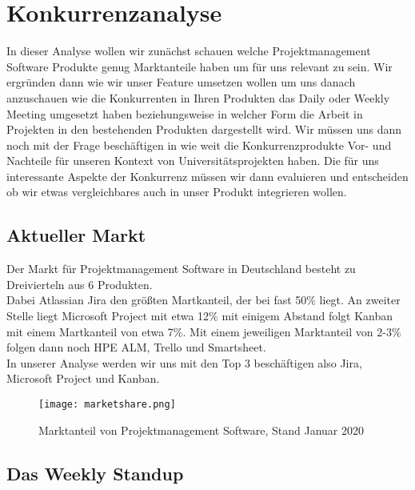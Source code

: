 \chapter{Konkurrenzanalyse}

In dieser Analyse wollen wir zunächst schauen welche Projektmanagement Software Produkte genug Marktanteile haben um für uns relevant zu sein. Wir ergründen dann wie wir unser Feature umsetzen wollen um uns danach anzuschauen wie die Konkurrenten in Ihren Produkten das Daily oder Weekly Meeting umgesetzt haben beziehungsweise in welcher Form die Arbeit in Projekten in den bestehenden Produkten dargestellt wird. Wir müssen uns dann noch mit der Frage beschäftigen in wie weit die Konkurrenzprodukte Vor- und Nachteile für unseren Kontext von Universitätsprojekten haben. Die für uns interessante Aspekte der Konkurrenz müssen wir dann evaluieren und entscheiden ob wir etwas vergleichbares auch in unser Produkt integrieren wollen.

\section{Aktueller Markt}

Der Markt für Projektmanagement Software in Deutschland besteht zu Dreivierteln aus 6 Produkten. \\
Dabei Atlassian Jira den größten Martkanteil, der bei fast 50\% liegt. An zweiter Stelle liegt Microsoft Project mit etwa 12\% mit einigem Abstand folgt Kanban mit einem Martkanteil von etwa 7\%. Mit einem jeweiligen Marktanteil von 2-3\% folgen dann noch HPE ALM, Trello und Smartsheet. \\
In unserer Analyse werden wir uns mit den Top 3 beschäftigen also Jira, Microsoft Project und Kanban. 

\begin{figure}[H]
	\centering
	\texttt{[image: marketshare.png]}
    \caption{Marktanteil von Projektmanagement Software, Stand Januar 2020\cite{statista2020}}
	\label{fig:marketshare}
\end{figure}

\section{Das Weekly Standup}

